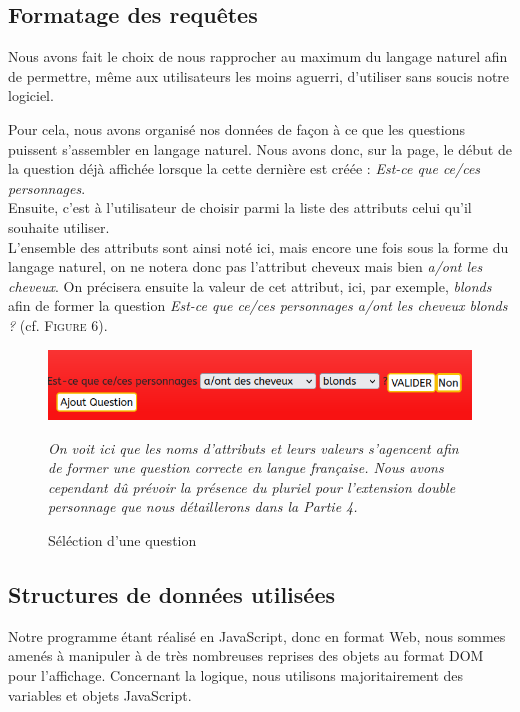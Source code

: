 \documentclass{article}
\begin{document}
		\subsection{Formatage des requêtes}
		    Nous avons fait le choix de nous rapprocher au maximum du langage naturel afin de permettre, même aux utilisateurs les moins aguerri, d'utiliser sans soucis notre logiciel.\\
		    \par
		    Pour cela, nous avons organisé nos données de façon à ce que les questions puissent s'assembler en langage naturel. Nous avons donc, sur la page, le début de la question déjà affichée lorsque la cette dernière est créée : \textit{Est-ce que ce/ces personnages}.\\
		    Ensuite, c'est à l'utilisateur de choisir parmi la liste des attributs celui qu'il souhaite utiliser.\\
		    L'ensemble des attributs sont ainsi noté ici, mais encore une fois sous la forme du langage naturel, on ne notera donc pas l'attribut \textsf{cheveux} mais bien \textit{a/ont les cheveux}. On précisera ensuite la valeur de cet attribut, ici, par exemple, \textit{blonds} afin de former la question \textit{Est-ce que ce/ces personnages a/ont les cheveux blonds ?} (cf. \textsc{Figure 6}).
    		\begin{figure}[h]
      			\includegraphics[width=12cm]{images/Questions.PNG}
      			\centering
      			\caption{Séléction d'une question}
      			\textit{On voit ici que les noms d'attributs et leurs valeurs s'agencent afin de former une question correcte en langue française. Nous avons cependant dû prévoir la présence du pluriel pour l'extension double personnage que nous détaillerons dans la Partie 4.}
    		\end{figure}
		
  		\subsection{Structures de données utilisées}
  		    Notre programme étant réalisé en JavaScript, donc en format Web, nous sommes amenés à manipuler à de très nombreuses reprises des objets au format DOM pour l'affichage. Concernant la logique, nous utilisons majoritairement des variables et objets JavaScript.
  		    
\end{document}
